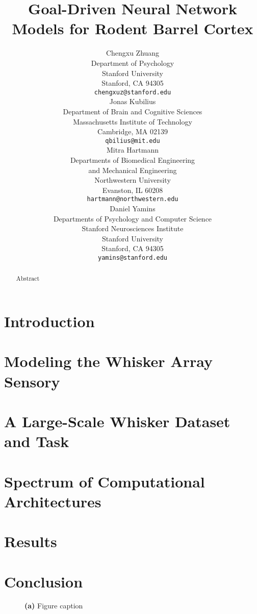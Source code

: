 \documentclass{article} %
\title{Goal-Driven Neural Network Models for Rodent Barrel Cortex}
\author{
Chengxu Zhuang\\
Department of Psychology\\
Stanford University\\
Stanford, CA 94305 \\
\texttt{chengxuz@stanford.edu} \\
\And
Jonas Kubilius \\
Department of Brain and Cognitive Sciences \\
Massachusetts Institute of Technology \\
Cambridge, MA  02139\\
\texttt{qbilius@mit.edu} \\
\And
Mitra Hartmann \\
Departments of Biomedical Engineering \\
and Mechanical Engineering \\
Northwestern University \\
Evanston, IL  60208\\
\texttt{hartmann@northwestern.edu} \\
\And
Daniel Yamins \\
Departments of Psychology and Computer Science \\
Stanford Neurosciences Institute \\
Stanford University \\
Stanford, CA 94305 \\
\texttt{yamins@stanford.edu} \\
}
\begin{document}
\maketitle

\begin{abstract}
Abstract
\end{abstract}


\section{Introduction} %


\section{Modeling the Whisker Array Sensory} %


\section{A Large-Scale Whisker Dataset and Task} %


\section{Spectrum of Computational Architectures} %


\section{Results} %


\section{Conclusion}  %


\begin{figure}[h]
\centering
\vspace{-2mm}
\caption{\textbf{(a)} Figure caption~\label{figname}}
\end{figure}


{\small
}

\end{document}
